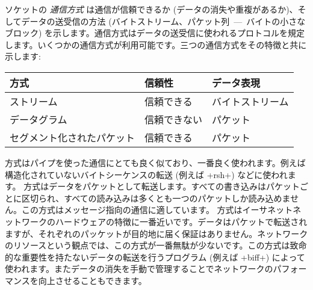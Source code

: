ソケットの \emph{通信方式} は通信が信頼できるか (データの消失や重複があるか)、そしてデータの送受信の方法 (バイトストリーム、パケット列~---~バイトの小さなブロック) を示します。通信方式はデータの送受信に使われるプロトコルを規定します。いくつかの通信方式が利用可能です。三つの通信方式をその特徴と共に示します:
%
\begin{center}
\begin{tabular}{lll}
  方式 & 信頼性 & データ表現 \\
  \hline
  ストリーム & 信頼できる & バイトストリーム \\
  データグラム & 信頼できない & パケット \\
  セグメント化されたパケット & 信頼できる & パケット \\
\hline
\end{tabular}
\end{center}
%
 方式はパイプを使った通信にとても良く似ており、一番良く使われます。例えば構造化されていないバイトシーケンスの転送 (例えば \ml+rsh+) などに使われます。 方式はデータをパケットとして転送します。すべての書き込みはパケットごとに区切られ、すべての読み込みは多くとも一つのパケットしか読み込めません。この方式はメッセージ指向の通信に適しています。 方式はイーサネットネットワークのハードウェアの特徴に一番近いです。データはパケットで転送されますが、それぞれのパッケットが目的地に届く保証はありません。ネットワークのリソースという観点では、この方式が一番無駄が少ないです。この方式は致命的な重要性を持たないデータの転送を行うプログラム (例えば \ml+biff+) によって使われます。またデータの消失を手動で管理することでネットワークのパフォーマンスを向上させることもできます。
